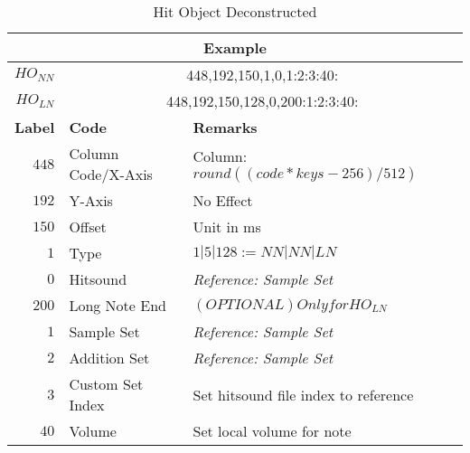 \documentclass{article}
\begin{document}
\begin{table}[ht]
	\begin{center}
    \caption{Hit Object Deconstructed}
    \label{tab:tbl_ho_dec}
    \begin{tabular}{r|l|l}
		\multicolumn{3}{c}{\textbf{Example}} \\
		\hline
		\textbf{$HO_{NN}$} & \multicolumn{2}{c}{448,192,150,1,0,1:2:3:40:} \\
		\textbf{$HO_{LN}$} & \multicolumn{2}{c}{448,192,150,128,0,200:1:2:3:40:} \\
		\hline
		\textbf{Label} & \textbf{Code} & \textbf{Remarks}\\
		\hline
		$ 448 $ & Column Code/X-Axis & Column: $round((code * keys - 256) / 512)$\\
		$ 192 $ & Y-Axis             & No Effect\\
		$ 150 $ & Offset             & Unit in ms\\
		$ 1 $   & Type               & $1|5|128 := NN|NN|LN$\\
		\hline
		$ 0 $   & Hitsound           & \textit{Reference: Sample Set}\\
		$ 200 $ & Long Note End      & $ (OPTIONAL) Only for HO_{LN} $ \\
		$ 1 $   & Sample Set         & \textit{Reference: Sample Set} \\	
		$ 2 $   & Addition Set       & \textit{Reference: Sample Set} \\	
		$ 3 $   & Custom Set Index   & Set hitsound file index to reference\\
		$ 40 $  & Volume             & Set local volume for note\\		
	\end{tabular}
	\end{center}
\end{table}
\end{document}
